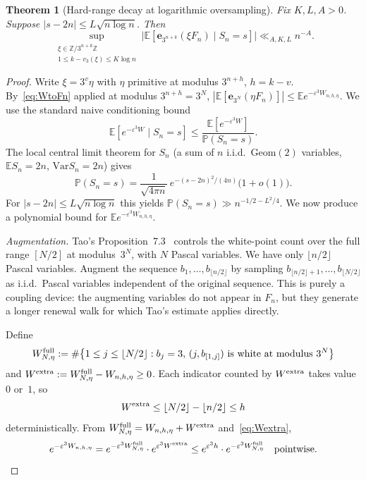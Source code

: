 \documentclass[11pt,a4paper]{amsart}
\theoremstyle{plain}
\newtheorem{theorem}{Theorem}[section]
\theoremstyle{definition}
\newcommand{\Z}{\mathbb{Z}}
\newcommand{\E}{\mathbb{E}}
\newcommand{\PP}{\mathbb{P}}
\newcommand{\Geom}{\mathrm{Geom}}
\newcommand{\Var}{\mathrm{Var}}
\begin{document}
\begin{theorem}[Hard-range decay at logarithmic oversampling]\label{thm:H}
Fix $K,L,A>0$.
Suppose $|s-2n|\le L\sqrt{n\log n}$.
Then
$$
\sup_{\substack{\xi\in\Z/3^{n+k}\Z\\1\le k-v_3(\xi)\le K\log n}}
\bigl|\E[\mathbf e_{3^{n+k}}(\xi F_n)\mid S_n=s]\bigr|\ll_{A,K,L} n^{-A}.
$$
\end{theorem}

\begin{proof}
Write $\xi=3^v\eta$ with $\eta$ primitive at modulus $3^{n+h}$, $h=k-v$.
By~\eqref{eq:WtoFn} applied at modulus $3^{n+h}=3^N$,
$|\E[\mathbf e_{3^N}(\eta F_n)]|\le\E e^{-\varepsilon^3 W_{n,h,\eta}}$.
We use the standard naive conditioning bound
\begin{equation}\label{eq:naivecond}
\E[e^{-\varepsilon^3 W}\mid S_n=s]\le\frac{\E[e^{-\varepsilon^3 W}]}{\PP(S_n=s)}.
\end{equation}
The local central limit theorem for $S_n$ (a sum of $n$ i.i.d.\ $\Geom(2)$
variables, $\E S_n=2n$, $\Var S_n=2n$) gives
\begin{equation}\label{eq:LCLT}
\PP(S_n=s)=\frac1{\sqrt{4\pi n}}\,e^{-(s-2n)^2/(4n)}\bigl(1+o(1)\bigr).
\end{equation}
For $|s-2n|\le L\sqrt{n\log n}$ this yields $\PP(S_n=s)\gg n^{-1/2-L^2/4}$.
We now produce a polynomial bound for $\E e^{-\varepsilon^3 W_{n,h,\eta}}$.

\emph{Augmentation.}
Tao's Proposition~7.3~\cite{Tao} controls the white-point count over the
full range $[N/2]$ at modulus~$3^N$, with $N$ Pascal variables.
We have only $\lfloor n/2\rfloor$ Pascal variables.
Augment the sequence $b_1,\dots,b_{\lfloor n/2\rfloor}$ by sampling
$b_{\lfloor n/2\rfloor+1},\dots,b_{\lfloor N/2\rfloor}$ as i.i.d.\ Pascal
variables independent of the original sequence.
This is purely a coupling device: the augmenting variables do not appear
in $F_n$, but they generate a longer renewal walk for which Tao's
estimate applies directly.

Define
$$
W^{\rm full}_{N,\eta}:=
\#\bigl\{1\le j\le \lfloor N/2\rfloor:b_j=3,\,(j,b_{[1,j]})\text{ is white at modulus }3^N\bigr\}
$$
and $W^{\rm extra}:=W^{\rm full}_{N,\eta}-W_{n,h,\eta}\ge 0$.
Each indicator counted by $W^{\rm extra}$ takes value~$0$ or~$1$, so
\begin{equation}\label{eq:Wextra}
W^{\rm extra}\le \lfloor N/2\rfloor-\lfloor n/2\rfloor\le h
\end{equation}
deterministically.
From $W^{\rm full}_{N,\eta}=W_{n,h,\eta}+W^{\rm extra}$ and~\eqref{eq:Wextra},
\begin{equation}\label{eq:Wpointwise}
e^{-\varepsilon^3 W_{n,h,\eta}}
=e^{-\varepsilon^3 W^{\rm full}_{N,\eta}}\cdot e^{\varepsilon^3 W^{\rm extra}}
\le e^{\varepsilon^3 h}\cdot e^{-\varepsilon^3 W^{\rm full}_{N,\eta}}
\quad\text{pointwise.}
\end{equation}


\end{proof}
\end{document}
